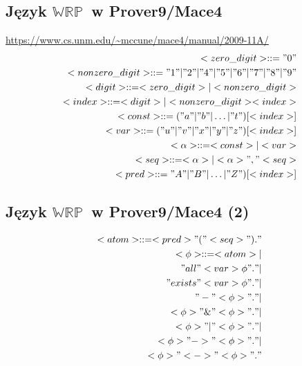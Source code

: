 \documentclass[12pt]{article}
\newcommand {\WRP} {\ensuremath{\mathbb{WRP}}}
\begin{document}
\subsection{Język \WRP\ w Prover9/Mace4}
%
\url{https://www.cs.unm.edu/~mccune/mace4/manual/2009-11A/}
%
\begin{eqnarray}
<zero\_digit> :: = "0" \\ %
<nonzero\_digit> :: = "1" | "2" | "4" | "5" | "6" | "7" | "8" | "9" \\ %
<digit> :: = <zero\_digit> | <nonzero\_digit> \\ %
<index> :: = <digit> | <nonzero\_digit><index> \\ %
<const> ::= ("a" | "b" | \dots | "t")[<index>] \\ %
<var> ::= ("u" | "v" | "x" | "y"| "z")[<index>] \\ %
<\alpha> ::= <const> | <var> \\ %
<seq> ::= <\alpha> | <\alpha>","<seq> \\ %
<pred> ::= "A" | "B" | \dots | "Z")[<index>]
\end{eqnarray}
%

\subsection{Język \WRP\ w Prover9/Mace4 (2)}
%
\begin{eqnarray}
<atom> ::= <pred>"("<seq>")." \\
%
<\phi> ::= <atom> | \nonumber  \\ 
"all"<var> \phi "." | \nonumber  \\
"exists"<var> \phi "." | \nonumber  \\
"-" <\phi> "." | \nonumber  \\
<\phi> "\&" <\phi> "." | \nonumber \\
<\phi> "|" <\phi> "." | \nonumber  \\
<\phi> "->" <\phi> "." | \nonumber  \\
<\phi> "<->" <\phi> "."
\end{eqnarray}
%
\end{document}
